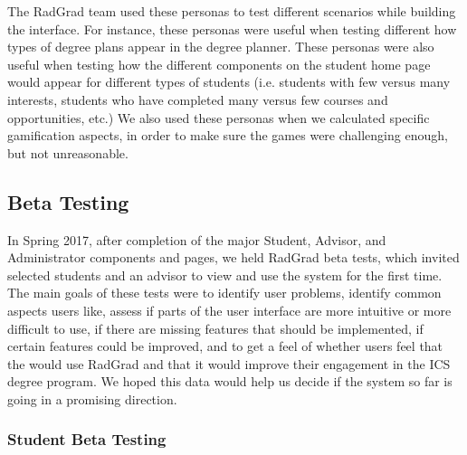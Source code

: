 The RadGrad team used these personas to test different scenarios while building the interface. For instance, these personas were useful when testing different how types of degree plans appear in the degree planner. These personas were also useful when testing how the different components on the student home page would appear for different types of students (i.e. students with few versus many interests, students who have completed many versus few courses and opportunities, etc.) We also used these personas when we calculated specific gamification aspects, in order to make sure the games were challenging enough, but not unreasonable. 
 
\subsection{Beta Testing}

In Spring 2017, after completion of the major Student, Advisor, and Administrator components and pages, we held RadGrad beta tests, which invited selected students and an advisor to view and use the system for the first time. The main goals of these tests were to identify user problems, identify common aspects users like, assess if parts of the user interface are more intuitive or more difficult to use, if there are missing features that should be implemented, if certain features could be improved, and to get a feel of whether users feel that the would use RadGrad and that it would improve their engagement in the ICS degree program. We hoped this data would help us decide if the system so far is going in a promising direction.

\subsubsection{Student Beta Testing}

